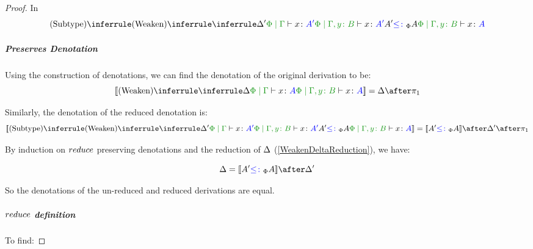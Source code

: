 \documentclass{report}
\begin{document}
\begin{framed}
\begin{proof}
                    In 
                    \begin{equation}
                        \ntreeruleII{\vsubtype}{
                        \ntreeruleI{\vweaken}{
                            \treeruleI{\D'}{\gpetyperelation{x}{A'}}
                        } {
                            \etyperelation{\P}{\gby}{x}{A'}
                        }
                        }{
                        A' \subtypep A
                        }{\etyperelation{\P}{\gby}{x}{A}}
                    \end{equation}
        
                    \subparagraph{Preserves Denotation}
                    Using the construction of denotations, we can find the denotation of the original derivation to be:
                    \begin{equation}
                        \deno{\ntreeruleI{\vweaken}{\treeruleI{\D}{\gpetyperelation{x}{A}}}{\etyperelation{\P}{\gby}{x}{A}}} = \D \after \p
                    \end{equation}
        
                    Similarly, the denotation of the reduced denotation is:
                    \begin{equation}
                        \deno{\ntreeruleII{\vsubtype}{
                            \ntreeruleI{\vweaken}{
                                \treeruleI{\D'}{\gpetyperelation{x}{A'}}
                            } {
                                \etyperelation{\P}{\gby}{x}{A'}
                            }
                            }{
                            A' \subtypep A
                            }{\etyperelation{\P}{\gby}{x}{A}}} = \deno{A'\subtypep A}\after \D' \after \p
                    \end{equation}
        
        
                    By induction on $reduce$ preserving denotations and the reduction of $\Delta$ (\ref{WeakenDeltaReduction}), we have:
        
                    \begin{equation}
                        \D = \deno{A' \subtypep A}\after\D'
                    \end{equation}
        
                    So the denotations of the un-reduced and reduced derivations are equal.
        
                    \case{\vfun}
                    \subparagraph{$reduce$ definition}
                        To find:
                    

\end{proof}
\end{framed}
\end{document}
